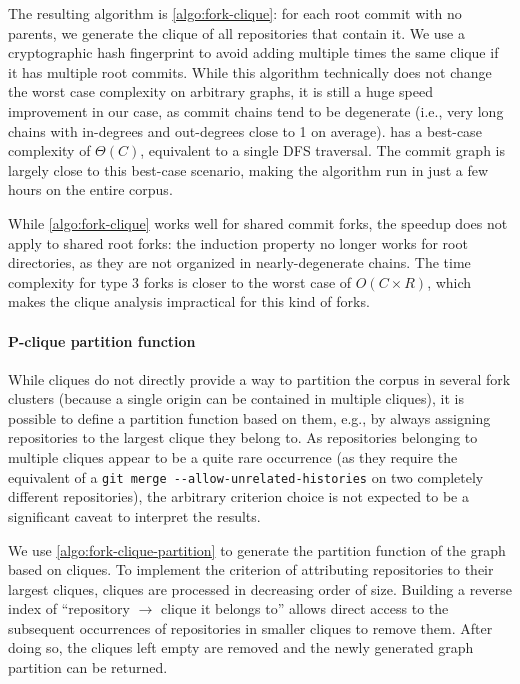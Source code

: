 The resulting algorithm is \cref{algo:fork-clique}: for each root commit
with no parents, we generate the clique of all repositories that contain it. We
use a cryptographic hash fingerprint to avoid adding multiple times the same
clique if it has multiple root commits. While this algorithm technically does
not change the worst case complexity on arbitrary graphs, it is still a huge
speed improvement in our case, as commit chains tend to be degenerate (i.e.,
very long chains with in-degrees and out-degrees close to 1 on
average).  has a best-case complexity of
$\Theta(C)$, equivalent to a single DFS traversal. The commit graph is largely
close to this best-case scenario, making the algorithm run in just a few hours
on the entire corpus.

While \cref{algo:fork-clique} works well for shared commit forks, the
speedup does not apply to shared root forks: the induction property no longer
works for root directories, as they are not organized in nearly-degenerate
chains. The time complexity for type 3 forks is closer to the worst case of
$O(C \times R)$, which makes the clique analysis impractical for this
kind of forks.

\paragraph{P-clique partition function}
While cliques do not directly provide a way to partition the corpus in several
fork clusters (because a single origin can be contained in multiple cliques),
it is possible to define a partition function based on them, e.g., by always
assigning repositories to the largest clique they belong to. As repositories
belonging to multiple cliques appear to be a quite rare occurrence (as they
require the equivalent of a \texttt{git merge -{}-allow-unrelated-histories} on
two completely different repositories), the arbitrary criterion choice is not
expected to be a significant caveat to interpret the results.

We use \cref{algo:fork-clique-partition} to generate the partition function of
the graph based on cliques. To implement the criterion of attributing
repositories to their largest cliques, cliques are processed in decreasing
order of size. Building a reverse index of ``repository $\rightarrow$ clique it
belongs to'' allows direct access to the subsequent occurrences of repositories
in smaller cliques to remove them. After doing so, the cliques left empty are
removed and the newly generated graph partition can be returned.


